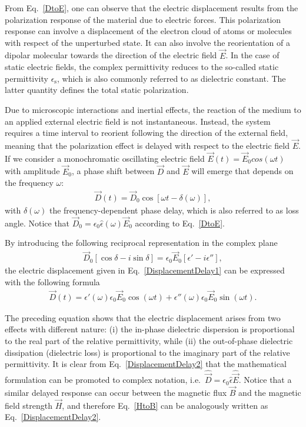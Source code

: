 From Eq.\ \ref{DtoE}, one can observe that the electric displacement results from the polarization response of the material due to electric forces. This polarization response can involve  a displacement of the electron cloud of atoms or molecules with respect of the unperturbed state. It can also involve the reorientation of a dipolar molecular towards the direction of the electric field $\vec{E}$. In the case of static electric fields, the complex permittivity reduces to the so-called static permittivity $\epsilon_\text{s}$, which is also commonly referred to as dielectric constant. The latter quantity defines the total static polarization. 



Due to microscopic interactions and inertial effects, the reaction of the medium to an applied external electric field is not instantaneous. Instead, the system requires a time interval to reorient following the direction of the external field, meaning that the polarization effect is delayed with respect to the electric field $\vec{E}$. If we consider a monochromatic oscillating electric field $\vec{E}(t) = \vec{E}_0 cos (\omega t)$ with amplitude $\vec{E}_0$, a phase shift between $\vec{D}$ and $\vec{E}$ will emerge that depends on the frequency $\omega$:
\begin{eqnarray}
\vec{D} (t) = \vec{D}_0 \cos [\omega t -\delta (\omega)],
\label{DisplacementDelay1}
\end{eqnarray}
\noindent with $\delta(\omega)$ the frequency-dependent phase delay, which is also referred to as loss angle. Notice that $\vec{D}_0 = \epsilon_0 \hat{\epsilon}(\omega) \vec{E}_0$ according to Eq.\ \ref{DtoE}.



By introducing the following reciprocal representation in the complex plane
\begin{eqnarray}
\vec{D}_0 [\cos \delta - i \sin \delta ] = \epsilon_0 \vec{E}_0 [\epsilon' - i \epsilon''],
\end{eqnarray}
\noindent the electric displacement given in Eq.\ \ref{DisplacementDelay1} can be expressed with the following formula
\begin{eqnarray}
\vec{D} (t) = \epsilon'(\omega) \epsilon_0 \vec{E}_0 \cos(\omega t) +  \epsilon'' (\omega) \epsilon_0 \vec{E}_0 \sin(\omega t).
\label{DisplacementDelay2}
\end{eqnarray}



The preceding equation shows that the electric displacement arises from two effects with different nature: (i) the in-phase dielectric dispersion is proportional to the real part of the relative permittivity, while (ii) the out-of-phase dielectric dissipation (dielectric loss) is proportional to the imaginary part of the relative permittivity. It is clear from Eq.\ \ref{DisplacementDelay2} that the mathematical formulation can be promoted to complex notation, i.e.\ $ \hat{\vec{D}} = \epsilon_0 \hat{\epsilon} \hat{\vec{E}}$. Notice that a similar delayed response can occur between the magnetic flux $\vec{B}$ and the magnetic field strength $\vec{H}$, and therefore Eq.\ \ref{HtoB} can be analogously written as Eq.\ \ref{DisplacementDelay2}.



